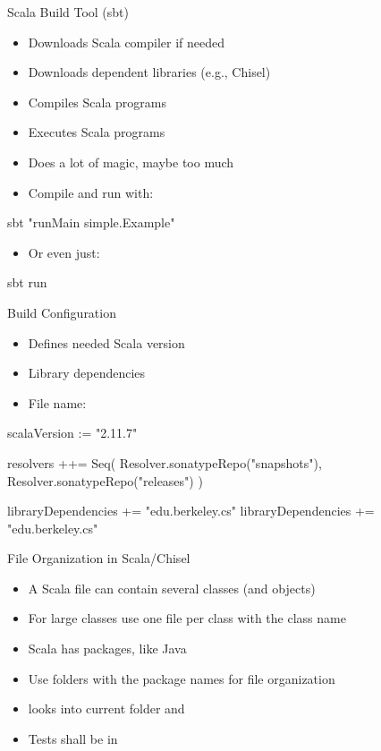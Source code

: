 \begin{frame}[fragile]{Scala Build Tool (sbt)}
\begin{itemize}
\item Downloads Scala compiler if needed
\item Downloads dependent libraries (e.g., Chisel)
\item Compiles Scala programs
\item Executes Scala programs
\item Does a lot of magic, maybe too much
\item Compile and run with:
\end{itemize}
\begin{chisel}
sbt "runMain simple.Example"
\end{chisel}
\begin{itemize}
\item Or even just:
\end{itemize}
\begin{chisel}
sbt run
\end{chisel}
\end{frame}

\begin{frame}[fragile]{Build Configuration}
\begin{itemize}
\item Defines needed Scala version
\item Library dependencies
\item File name: 
\end{itemize}
\begin{chisel}
scalaVersion := "2.11.7"

resolvers ++= Seq(
  Resolver.sonatypeRepo("snapshots"),
  Resolver.sonatypeRepo("releases")
)

libraryDependencies += "edu.berkeley.cs" %
libraryDependencies += "edu.berkeley.cs" %
\end{chisel}
\end{frame}

\begin{frame}[fragile]{File Organization in Scala/Chisel}
\begin{itemize}
\item A Scala file can contain several classes (and objects)
\item For large classes use one file per class with the class name
\item Scala has packages, like Java
\item Use folders with the package names for file organization
\item {} looks into current folder and 
\item Tests shall be in 
\end{itemize}
\end{frame}

